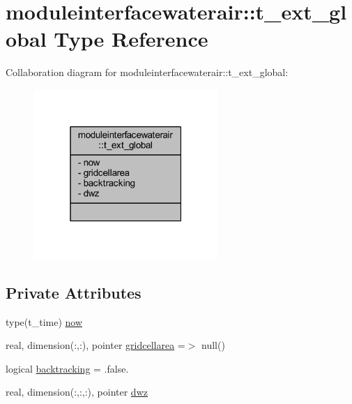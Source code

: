 \hypertarget{structmoduleinterfacewaterair_1_1t__ext__global}{}\section{moduleinterfacewaterair\+:\+:t\+\_\+ext\+\_\+global Type Reference}
\label{structmoduleinterfacewaterair_1_1t__ext__global}


Collaboration diagram for moduleinterfacewaterair\+:\+:t\+\_\+ext\+\_\+global\+:\nopagebreak
\begin{figure}[H]
\begin{center}
\leavevmode
\includegraphics[width=199pt]{structmoduleinterfacewaterair_1_1t__ext__global__coll__graph}
\end{center}
\end{figure}
\subsection*{Private Attributes}
\begin{DoxyCompactItemize}
\item 
type(t\+\_\+time) \mbox{\hyperlink{structmoduleinterfacewaterair_1_1t__ext__global_a63338321d3f4705bc08c0178f7dbfa9a}{now}}
\item 
real, dimension(\+:,\+:), pointer \mbox{\hyperlink{structmoduleinterfacewaterair_1_1t__ext__global_afe4ae1461d713d403a3358c521b54818}{gridcellarea}} =$>$ null()
\item 
logical \mbox{\hyperlink{structmoduleinterfacewaterair_1_1t__ext__global_adb13d9826ef99045f9f7666b8a278940}{backtracking}} = .false.
\item 
real, dimension(\+:,\+:,\+:), pointer \mbox{\hyperlink{structmoduleinterfacewaterair_1_1t__ext__global_a7792efebdac971d69432ae73e47720c3}{dwz}}
\end{DoxyCompactItemize}


